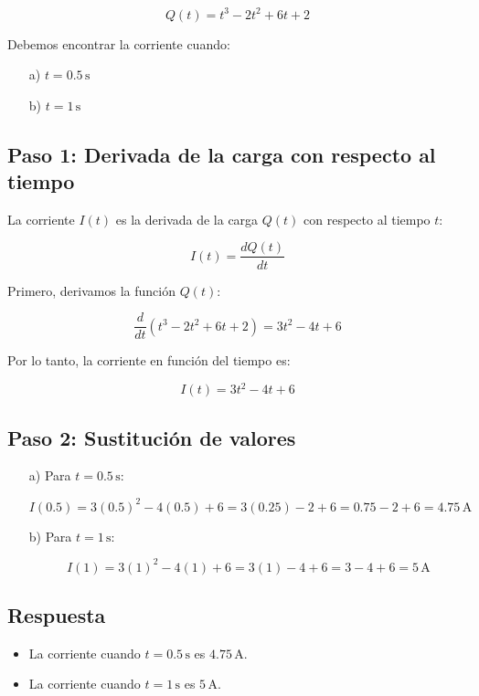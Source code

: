 \documentclass[11pt,letterpaper]{article}
\begin{document}
\[
Q(t) = t^3 - 2t^2 + 6t + 2
\]

Debemos encontrar la corriente cuando:

\begin{itemize}
    \item[a)] \( t = 0.5 \, \text{s} \)
    \item[b)] \( t = 1 \, \text{s} \)
\end{itemize}

\subsection*{Paso 1: Derivada de la carga con respecto al tiempo}

La corriente \( I(t) \) es la derivada de la carga \( Q(t) \) con respecto al tiempo \( t \):

\[
I(t) = \frac{dQ(t)}{dt}
\]

Primero, derivamos la función \( Q(t) \):

\[
\frac{d}{dt} \left( t^3 - 2t^2 + 6t + 2 \right) = 3t^2 - 4t + 6
\]

Por lo tanto, la corriente en función del tiempo es:

\[
I(t) = 3t^2 - 4t + 6
\]

\subsection*{Paso 2: Sustitución de valores}

\begin{itemize}
    \item[a)] Para \( t = 0.5 \, \text{s} \):

    \[
    I(0.5) = 3(0.5)^2 - 4(0.5) + 6 = 3(0.25) - 2 + 6 = 0.75 - 2 + 6 = 4.75 \, \text{A}
    \]

    \item[b)] Para \( t = 1 \, \text{s} \):

    \[
    I(1) = 3(1)^2 - 4(1) + 6 = 3(1) - 4 + 6 = 3 - 4 + 6 = 5 \, \text{A}
    \]
\end{itemize}

\subsection*{Respuesta}

\begin{itemize}
    \item La corriente cuando \( t = 0.5 \, \text{s} \) es \( 4.75 \, \text{A} \).
    \item La corriente cuando \( t = 1 \, \text{s} \) es \( 5 \, \text{A} \).
\end{itemize}
\end{document}
